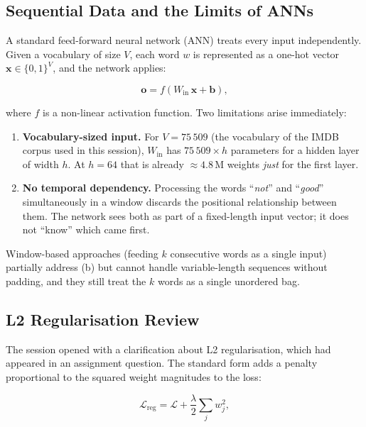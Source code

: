 \documentclass[12pt,a4paper]{article}
\begin{document}
\subsection{Sequential Data and the Limits of ANNs}
\label{subsec:ann_limits}

A standard feed-forward neural network (ANN) treats every input
independently.  Given a vocabulary of size $V$, each word $w$ is
represented as a one-hot vector $\mathbf{x} \in \{0,1\}^V$, and the
network applies:

\begin{equation}
  \mathbf{o} = f\!\left(W_{\text{in}}\,\mathbf{x} + \mathbf{b}\right),
  \label{eq:ann_forward}
\end{equation}

where $f$ is a non-linear activation function.  Two limitations arise
immediately:

\begin{enumerate}[label=(\alph*)]
  \item \textbf{Vocabulary-sized input.}  For $V = 75\,509$ (the vocabulary
        of the IMDB corpus used in this session), $W_{\text{in}}$ has
        $75\,509 \times h$ parameters for a hidden layer of width $h$.
        At $h=64$ that is already $\approx 4.8$\,M weights \emph{just}
        for the first layer.
  \item \textbf{No temporal dependency.}  Processing the words
        ``\emph{not}'' and ``\emph{good}'' simultaneously in a window
        discards the positional relationship between them.  The network
        sees both as part of a fixed-length input vector; it does not
        ``know'' which came first.
\end{enumerate}

Window-based approaches (feeding $k$ consecutive words as a single
input) partially address (b) but cannot handle variable-length
sequences without padding, and they still treat the $k$ words as a
single unordered bag.

\subsection{L2 Regularisation Review}
\label{subsec:l2_review}

The session opened with a clarification about L2 regularisation,
which had appeared in an assignment question.  The standard form adds
a penalty proportional to the squared weight magnitudes to the loss:

\begin{equation}
  \mathcal{L}_{\text{reg}} = \mathcal{L} + \frac{\lambda}{2}
  \sum_{j} w_j^2,
  \label{eq:l2_regularisation}
\end{equation}
\end{document}
